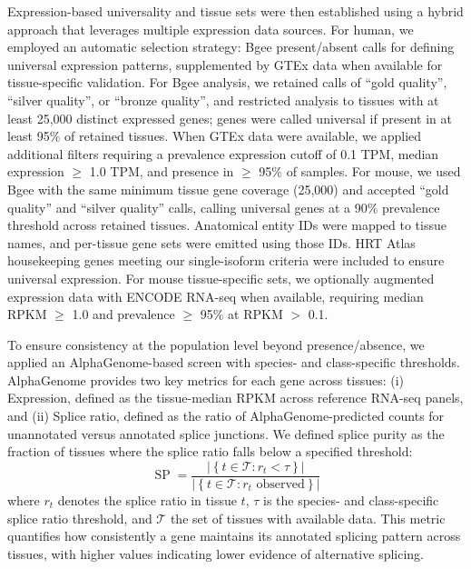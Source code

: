 \documentclass[pdflatex,sn-nature]{sn-jnl}%
\begin{document}
Expression-based universality and tissue sets were then established using a hybrid approach that leverages multiple expression data sources. For human, we employed an automatic selection strategy: Bgee\cite{Bastian2021Bgee} present/absent calls for defining universal expression patterns, supplemented by GTEx\cite{Lonsdale2013GTEx} data when available for tissue-specific validation. For Bgee analysis, we retained calls of ``gold quality'', ``silver quality'', or ``bronze quality'', and restricted analysis to tissues with at least 25,000 distinct expressed genes; genes were called universal if present in at least 95\% of retained tissues. When GTEx data were available, we applied additional filters requiring a prevalence expression cutoff of 0.1 TPM, median expression $\geq$ 1.0 TPM, and presence in $\geq$ 95\% of samples. For mouse, we used Bgee with the same minimum tissue gene coverage (25,000) and accepted ``gold quality'' and ``silver quality'' calls, calling universal genes at a 90\% prevalence threshold across retained tissues. Anatomical entity IDs were mapped to tissue names, and per-tissue gene sets were emitted using those IDs. HRT Atlas housekeeping genes meeting our single-isoform criteria were included to ensure universal expression\cite{Hounkpe2020HRT}. For mouse tissue-specific sets, we optionally augmented expression data with ENCODE RNA-seq when available, requiring median RPKM $\geq$ 1.0 and prevalence $\geq$ 95\% at RPKM $>$ 0.1.

To ensure consistency at the population level beyond presence/absence, we applied an AlphaGenome-based screen with species- and class-specific thresholds\cite{Avsec2025AlphaGenome}. AlphaGenome provides two key metrics for each gene across tissues: (i) Expression, defined as the tissue-median RPKM across reference RNA-seq panels, and (ii) Splice ratio, defined as the ratio of AlphaGenome-predicted counts for unannotated versus annotated splice junctions. We defined splice purity as the fraction of tissues where the splice ratio falls below a specified threshold:
\begin{equation}
\operatorname{SP} = \frac{\left|\left\{ t \in \mathcal{T} : r_t < \tau \right\}\right|}{\left|\left\{ t \in \mathcal{T} : r_t \text{ observed}\right\}\right|}
\end{equation}
where $r_t$ denotes the splice ratio in tissue $t$, $\tau$ is the species- and class-specific splice ratio threshold, and $\mathcal{T}$ the set of tissues with available data. This metric quantifies how consistently a gene maintains its annotated splicing pattern across tissues, with higher values indicating lower evidence of alternative splicing.
\end{document}
